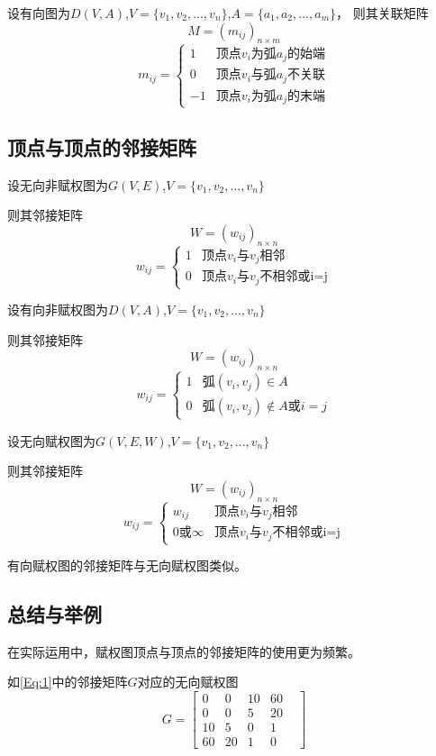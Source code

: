 \documentclass[withoutpreface]{cumcmthesis}
\begin{document}
设有向图为$D(V,A)$,$V=\{v_1,v_2,...,v_n\}$,$A=\{a_1,a_2,...,a_m\}$，
则其关联矩阵
$$
  M=(m_{ij})_{n\times m}
$$
$$
  m_{ij}=\begin{cases}
    1  & \mbox{顶点$v_i$为弧$a_j$的始端} \\
    0  & \mbox{顶点$v_i$与弧$a_j$不关联} \\
    -1 & \mbox{顶点$v_i$为弧$a_j$的末端}
  \end{cases}
$$

\subsection{顶点与顶点的邻接矩阵}

设无向非赋权图为$G(V,E)$,$V=\{v_1,v_2,...,v_n\}$

则其邻接矩阵
$$
  W=(w_{ij})_{n\times n}
$$
$$
  w_{ij}=\begin{cases}
    1 & \mbox{顶点$v_i$与$v_j$相邻}      \\
    0 & \mbox{顶点$v_i$与$v_j$不相邻或i=j}
  \end{cases}
$$

设有向非赋权图为$D(V,A)$,$V=\{v_1,v_2,...,v_n\}$

则其邻接矩阵
$$
  W=(w_{ij})_{n\times n}
$$
$$
  w_{ij}=\begin{cases}
    1 & \mbox{弧}(v_i,v_j)\in A               \\
    0 & \mbox{弧}(v_i,v_j)\notin A\mbox{或}i=j
  \end{cases}
$$

设无向赋权图为$G(V,E,W)$,$V=\{v_1,v_2,...,v_n\}$

则其邻接矩阵
$$
  W=(w_{ij})_{n\times n}
$$
$$
  w_{ij}=\begin{cases}
    w_{ij}          & \mbox{顶点$v_i$与$v_j$相邻}      \\
    0\mbox{或}\infty & \mbox{顶点$v_i$与$v_j$不相邻或i=j}
  \end{cases}
$$

有向赋权图的邻接矩阵与无向赋权图类似。

\subsection{总结与举例}

在实际运用中，赋权图顶点与顶点的邻接矩阵的使用更为频繁。

如\cref{Eq:1}中的邻接矩阵$G$对应的无向赋权图
\begin{equation}\label{Eq:1}
  G =
  \begin{bmatrix}
    0  & 0  & 10 & 60   \\
    0  & 0  & 5  & 20 & \\
    10 & 5  & 0  & 1    \\
    60 & 20 & 1  & 0
  \end{bmatrix}
\end{equation}
\end{document}
